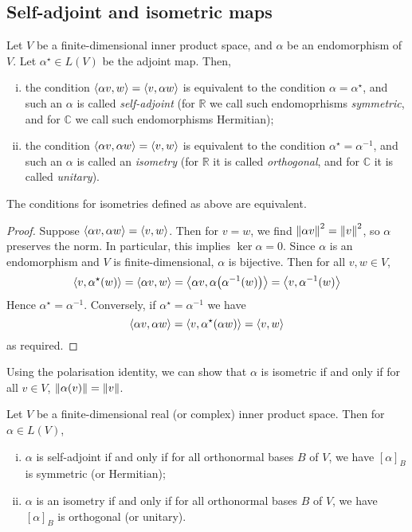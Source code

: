 \subsection{Self-adjoint and isometric maps}
\begin{definition}
	Let \( V \) be a finite-dimensional inner product space, and \( \alpha \) be an endomorphism of \( V \).
	Let \( \alpha^\star \in L(V) \) be the adjoint map.
	Then,
	\begin{enumerate}[(i)]
		\item the condition \( \left\langle{\alpha v, w}\right\rangle = \left\langle{v, \alpha w}\right\rangle \) is equivalent to the condition \( \alpha = \alpha^\star \), and such an \( \alpha \) is called \textit{self-adjoint} (for \( \mathbb R \) we call such endomoprhisms \textit{symmetric}, and for \( \mathbb C \) we call such endomorphisms Hermitian);
		\item the condition \( \left\langle{\alpha v, \alpha w}\right\rangle = \left\langle{v, w}\right\rangle \) is equivalent to the condition \( \alpha^\star = \alpha^{-1} \), and such an \( \alpha \) is called an \textit{isometry} (for \( \mathbb R \) it is called \textit{orthogonal}, and for \( \mathbb C \) it is called \textit{unitary}).
	\end{enumerate}
\end{definition}
\begin{proposition}
	The conditions for isometries defined as above are equivalent.
\end{proposition}
\begin{proof}
	Suppose \( \left\langle{\alpha v, \alpha w}\right\rangle = \left\langle{v,w}\right\rangle \).
	Then for \( v = w \), we find \( \norm{\alpha v}^2 = \norm{v}^2 \), so \( \alpha \) preserves the norm.
	In particular, this implies \( \ker \alpha = \qty{0} \).
	Since \( \alpha \) is an endomorphism and \( V \) is finite-dimensional, \( \alpha \) is bijective.
	Then for all \( v, w \in V \),
	\[
		\left\langle{v, \alpha^\star(w)}\right\rangle = \left\langle{\alpha v, w}\right\rangle = \left\langle{\alpha v, \alpha\qty(\alpha^{-1}(w))}\right\rangle = \left\langle{v, \alpha^{-1}(w)}\right\rangle
	\]
	Hence \( \alpha^\star = \alpha^{-1} \).
	Conversely, if \( \alpha^\star = \alpha^{-1} \) we have
	\[
		\left\langle{\alpha v, \alpha w}\right\rangle = \left\langle{v, \alpha^\star(\alpha w)}\right\rangle = \left\langle{v, w}\right\rangle
	\]
	as required.
\end{proof}
\begin{remark}
	Using the polarisation identity, we can show that \( \alpha \) is isometric if and only if for all \( v \in V \), \( \norm{\alpha(v)} = \norm{v} \).
\end{remark}
\begin{lemma}
	Let \( V \) be a finite-dimensional real (or complex) inner product space.
	Then for \( \alpha \in L(V) \),
	\begin{enumerate}[(i)]
		\item \( \alpha \) is self-adjoint if and only if for all orthonormal bases \( B \) of \( V \), we have \( [\alpha]_B \) is symmetric (or Hermitian);
		\item \( \alpha \) is an isometry if and only if for all orthonormal bases \( B \) of \( V \), we have \( [\alpha]_B \) is orthogonal (or unitary).
	\end{enumerate}
\end{lemma}
